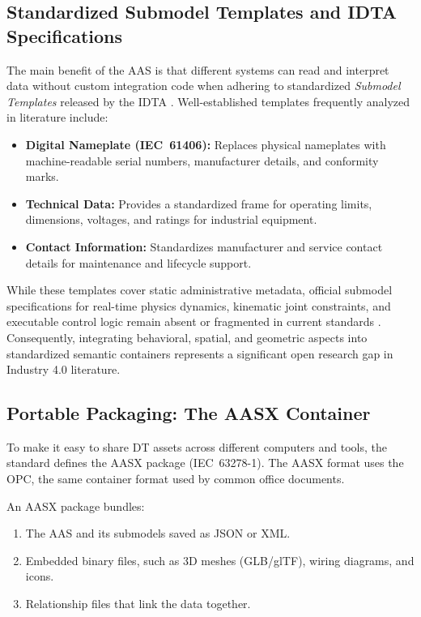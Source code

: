 \subsection{Standardized Submodel Templates and \texorpdfstring{\gls{IDTA}}{IDTA} Specifications}

The main benefit of the \gls{AAS} is that different systems can read and interpret data without custom integration code when adhering to standardized \textit{Submodel Templates} released by the \gls{IDTA} \cite{Abdel-Aty2022,Ahvanouee2025}. Well-established templates frequently analyzed in literature include:
\begin{itemize}
    \item \textbf{Digital Nameplate (\gls{IEC}~61406):} Replaces physical nameplates with machine-readable serial numbers, manufacturer details, and conformity marks.
    \item \textbf{Technical Data:} Provides a standardized frame for operating limits, dimensions, voltages, and ratings for industrial equipment.
    \item \textbf{Contact Information:} Standardizes manufacturer and service contact details for maintenance and lifecycle support.
\end{itemize}

While these templates cover static administrative metadata, official submodel specifications for real-time physics dynamics, kinematic joint constraints, and executable control logic remain absent or fragmented in current standards \cite{Pajpach2025,Perez2025}. Consequently, integrating behavioral, spatial, and geometric aspects into standardized semantic containers represents a significant open research gap in Industry 4.0 literature.

\subsection{Portable Packaging: The \texorpdfstring{\gls{AASX}}{AASX} Container}

To make it easy to share \gls{DT} assets across different computers and tools, the standard defines the \gls{AASX} package (\gls{IEC}~63278-1). The \gls{AASX} format uses the \gls{OPC}, the same container format used by common office documents.

An \gls{AASX} package bundles:
\begin{enumerate}
    \item The \gls{AAS} and its submodels saved as \gls{JSON} or \gls{XML}.
    \item Embedded binary files, such as 3D meshes (\gls{GLB}/\gls{glTF}), wiring diagrams, and icons.
    \item Relationship files that link the data together.
\end{enumerate}


